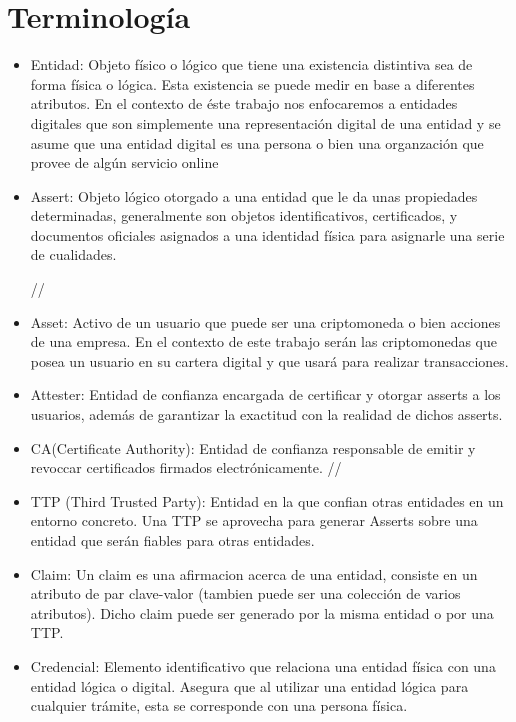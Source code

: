 \documentclass[12pt]{report}
\begin{document}
\section{Terminología}
\begin{itemize}

\item
Entidad: Objeto físico o lógico que tiene una existencia distintiva sea de forma física o lógica. 
Esta existencia se puede medir en base a diferentes atributos.
En el contexto de éste trabajo nos enfocaremos a entidades digitales que son simplemente una representación digital de una entidad y se asume que una entidad digital es una persona o bien una organzación que provee de algún servicio online 

\item
Assert: Objeto lógico otorgado a una entidad que le da unas propiedades determinadas, generalmente son objetos identificativos, certificados, y documentos oficiales asignados a una identidad física para asignarle una serie de cualidades.

//
\item
Asset: Activo de un usuario que puede ser una criptomoneda o bien acciones de una empresa. En el contexto de este trabajo serán las criptomonedas que posea un usuario en su cartera digital y que usará para realizar transacciones.

\item 
Attester: Entidad de confianza encargada de certificar y otorgar asserts a los usuarios, además de garantizar la exactitud con la realidad de dichos asserts.

\item
CA(Certificate Authority): Entidad de confianza responsable de emitir y revoccar certificados firmados electrónicamente.
//
\item
TTP (Third Trusted Party): Entidad en la que confian otras entidades en un entorno concreto.
Una TTP se aprovecha para generar Asserts sobre una entidad que serán fiables para otras entidades.

\item
Claim: Un claim es una afirmacion acerca de una entidad, consiste en un atributo de par clave-valor (tambien puede ser una colección de varios atributos). Dicho claim puede ser generado por la misma entidad o por una TTP.

\item
Credencial: Elemento identificativo que relaciona una entidad física con una entidad lógica o digital. Asegura que al utilizar una entidad lógica para cualquier trámite, esta se corresponde con una persona física.


\end{itemize}
\end{document}
